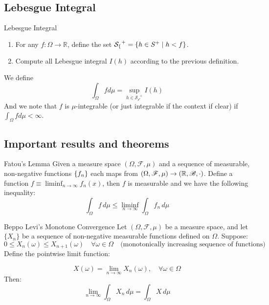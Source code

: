 \subsection{Lebesgue Integral}
\begin{df}{Lebesgue Integral}
\begin{enumerate}
	\item For any \( f: \Omega \to \mathbb{R} \), define the set $\mathcal{S_f}^+ = \qty{h\in S^+\mid h<f}$.
	\item Compute all Lebesgue integral $I(h)$ according to the previous definition. 
\end{enumerate}
We define 
$$\int_\Omega fd\mu = \sup_{h\in \mathcal{S_f}^+} I(h)$$
And we note that $f$ is $\mu$-integrable (or just integrable if the context if clear) if $\int_\Omega fd\mu <\infty$. 
\end{df}

\subsection{Important results and theorems}

\begin{lem}{Fatou's Lemma}
\noindent Given a measure space $(\Omega, \mathscr{F}, \mu)$ and a sequence of measurable, non-negative functions $\qty{f_n}$ each maps from $(\Omega, \mathscr{F}, \mu) \rightarrow ({\mathbb{R}}, \mathscr{B}, \cdot)$. Define a function $f \equiv \liminf_{n\to \infty} f_n(x)$, then $f$ is measurable and we have the following inequality: 
$$\int_\Omega f \, d\mu \leq \liminf_{n\to\infty} \int_\Omega f_n \, d\mu$$
\end{lem}

\begin{cor}{Beppo Levi's Monotone Convergence}
Let \((\Omega, \mathscr{F}, \mu)\) be a measure space, and let $\{X_n\}$ be a sequence of non-negative measurable functions defined on $\Omega$. Suppose:
$$0 \leq X_n(\omega) \leq X_{n+1}(\omega) \quad \forall \omega \in \Omega \quad \text{(monotonically increasing sequence of functions)}$$
Define the pointwise limit function:

$$X(\omega) = \lim_{n \to \infty} X_n(\omega), \quad \forall \omega \in \Omega$$
Then:
$$\lim_{n \to \infty} \int_\Omega X_n \, d\mu = \int_\Omega X \, d\mu$$
\end{cor}

